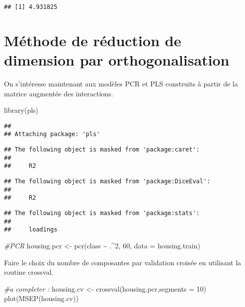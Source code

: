 \documentclass[
]{article}
\newenvironment{Shaded}{\begin{snugshade}}{\end{snugshade}}
\newcommand{\AttributeTok}[1]{\textcolor[rgb]{0.77,0.63,0.00}{#1}}
\newcommand{\CommentTok}[1]{\textcolor[rgb]{0.56,0.35,0.01}{\textit{#1}}}
\newcommand{\DecValTok}[1]{\textcolor[rgb]{0.00,0.00,0.81}{#1}}
\newcommand{\FunctionTok}[1]{\textcolor[rgb]{0.00,0.00,0.00}{#1}}
\newcommand{\NormalTok}[1]{#1}
\newcommand{\OtherTok}[1]{\textcolor[rgb]{0.56,0.35,0.01}{#1}}
\newcommand{\SpecialCharTok}[1]{\textcolor[rgb]{0.00,0.00,0.00}{#1}}
\begin{document}
\begin{verbatim}
## [1] 4.931825
\end{verbatim}

\hypertarget{muxe9thode-de-ruxe9duction-de-dimension-par-orthogonalisation}{%
\section{Méthode de réduction de dimension par
orthogonalisation}\label{muxe9thode-de-ruxe9duction-de-dimension-par-orthogonalisation}}

On s'intéresse maintenant aux modèles PCR et PLS construits à partir de
la matrice augmentée des interactions.

\begin{Shaded}
\begin{Highlighting}[]
\FunctionTok{library}\NormalTok{(pls)}
\end{Highlighting}
\end{Shaded}

\begin{verbatim}
## 
## Attaching package: 'pls'
\end{verbatim}

\begin{verbatim}
## The following object is masked from 'package:caret':
## 
##     R2
\end{verbatim}

\begin{verbatim}
## The following object is masked from 'package:DiceEval':
## 
##     R2
\end{verbatim}

\begin{verbatim}
## The following object is masked from 'package:stats':
## 
##     loadings
\end{verbatim}

\begin{Shaded}
\begin{Highlighting}[]
\CommentTok{\#PCR}
\NormalTok{housing.pcr }\OtherTok{\textless{}{-}} \FunctionTok{pcr}\NormalTok{(class }\SpecialCharTok{\textasciitilde{}}\NormalTok{ .}\SpecialCharTok{\^{}}\DecValTok{2}\NormalTok{, }\DecValTok{60}\NormalTok{, }\AttributeTok{data =}\NormalTok{ housing.train)}
\end{Highlighting}
\end{Shaded}

Faire le choix du nombre de composantes par validation croisée en
utilisant la routine crossval.

\begin{Shaded}
\begin{Highlighting}[]
\CommentTok{\#a completer :}
\NormalTok{housing.cv }\OtherTok{\textless{}{-}} \FunctionTok{crossval}\NormalTok{(housing.pcr,}\AttributeTok{segments =} \DecValTok{10}\NormalTok{)}
\FunctionTok{plot}\NormalTok{(}\FunctionTok{MSEP}\NormalTok{(housing.cv))}
\end{Highlighting}
\end{Shaded}
\end{document}
